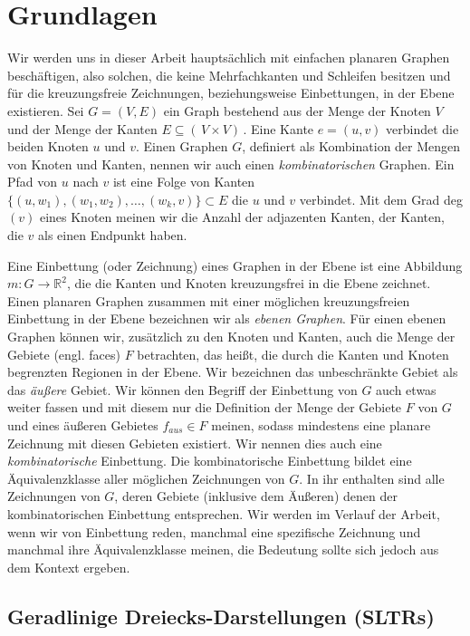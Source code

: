 \chapter{Grundlagen}\label{pre}

Wir werden uns in dieser Arbeit hauptsächlich mit einfachen planaren Graphen beschäftigen, also solchen, die keine Mehrfachkanten und Schleifen besitzen und für die kreuzungsfreie Zeichnungen, beziehungsweise Einbettungen, in der Ebene existieren. Sei $G = (V,E)$ ein Graph bestehend aus der Menge der Knoten $V$ und der Menge der Kanten $E \subseteq ( \,V \times V ) \,$. Eine Kante $e=(u,v)$ verbindet die beiden Knoten $u$ und $v$. Einen Graphen $G$, definiert als Kombination der Mengen von Knoten und Kanten, nennen wir auch einen \textit{kombinatorischen} Graphen. Ein Pfad von $u$ nach $v$ ist eine Folge von Kanten $\{(u,w_1),(w_1,w_2),\ldots,(w_k,v)\} \subset E$ die $u$ und $v$ verbindet. Mit dem Grad deg$(v)$ eines Knoten meinen wir die Anzahl der adjazenten Kanten, der Kanten, die $v$ als einen Endpunkt haben.

Eine Einbettung (oder Zeichnung) eines Graphen in der Ebene ist eine Abbildung $m:G\to\mathbb{R}^2$, die die Kanten und Knoten kreuzungsfrei in die Ebene zeichnet. Einen planaren Graphen zusammen mit einer möglichen kreuzungsfreien Einbettung in der Ebene bezeichnen wir als \textit{ebenen Graphen}. Für einen ebenen Graphen können wir, zusätzlich zu den Knoten und Kanten, auch die Menge der Gebiete (engl. faces) $F$ betrachten, das heißt, die durch die Kanten und Knoten begrenzten Regionen in der Ebene. Wir bezeichnen das unbeschränkte Gebiet als das \textit{äußere} Gebiet. Wir können den Begriff der Einbettung von $G$ auch etwas weiter fassen und mit diesem nur die Definition der Menge der Gebiete $F$ von $G$ und eines äußeren Gebietes $f_{aus} \in F$ meinen, sodass mindestens eine planare Zeichnung mit diesen Gebieten existiert. Wir nennen dies auch eine \textit{kombinatorische} Einbettung. Die kombinatorische Einbettung bildet eine Äquivalenzklasse aller möglichen Zeichnungen von $G$. In ihr enthalten sind alle Zeichnungen von $G$, deren Gebiete (inklusive dem Äußeren) denen der kombinatorischen Einbettung entsprechen. Wir werden im Verlauf der Arbeit, wenn wir von Einbettung reden, manchmal eine spezifische Zeichnung und manchmal ihre Äquivalenzklasse meinen, die Bedeutung sollte sich jedoch aus dem Kontext ergeben.

\section{Geradlinige Dreiecks-Darstellungen (SLTRs)}

